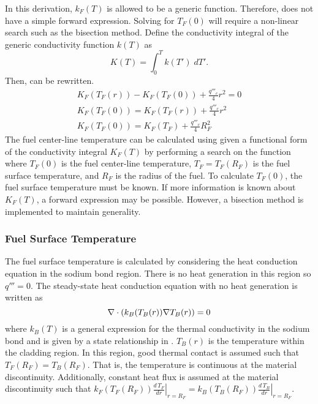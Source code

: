       In this derivation, $k_F(T)$ is allowed to be a generic function. 
      Therefore,  does not have a simple forward 
      expression. Solving for $T_F(0)$ will require a non-linear search such as
      the bisection method. Define the conductivity integral of the generic
      conductivity function $k(T)$ as
      \begin{equation}
        \label{eq:conductivity_integral}
        K(T) = \int_0^T k(T') \; dT'.
      \end{equation}
      Then,  can be rewritten.
      \begin{gather}
        K_F(T_F(r)) - K_F(T_F(0)) + \frac{q'''_c}{4} r^2 = 0 \\
        K_F(T_F(0)) = K_F(T_F(r)) + \frac{q'''_c}{4} r^2 \\
        \label{eq:tcl_conductivity_integral}
        K_F(T_F(0)) = K_F(T_F) + \frac{q'''_c}{4} R_F^2
      \end{gather}
      The fuel center-line temperature can be calculated using
       given a functional form of the
      conductivity integral $K_F(T)$ by performing a search on the function
      where $T_F(0)$ is the fuel center-line temperature, $T_F=T_F(R_F)$ is the
      fuel surface temperature, and $R_F$ is the radius of the fuel. To
      calculate $T_F(0)$, the fuel surface temperature must be known.
      If more information is known about $K_F(T)$, a forward expression
      may be possible. However, a bisection method is implemented to maintain
      generality.

    \subsubsection{Fuel Surface Temperature}
      The fuel surface temperature is calculated by considering the heat
      conduction equation in the sodium bond region. There is no heat generation
      in this region so $q'''=0$.
      The steady-state heat conduction equation with no heat generation is
      written as
      \begin{equation}
        \label{eq:tc_grad}
        \mathbf{\nabla} \cdot (k_B(T_B(r)) \mathbf{\nabla} T_B(r)) = 0
      \end{equation}
      where $k_B(T)$ is a general expression for the thermal conductivity in the
      sodium bond and is given by a state relationship in \cite{sodiumProp}.
      $T_B(r)$ is the temperature within the cladding region.
      In this region, good thermal contact is
      assumed such that $T_F(R_F)=T_B(R_F)$. That is, the temperature is 
      continuous at the material discontinuity. Additionally, constant heat flux
      is assumed at the material discontinuity such that $k_F(T_F(R_F))
      \left.\frac{d\,T_F}{dr}\right|_{r=R_F} = k_B(T_B(R_F))
      \left.\frac{d\,T_B}{dr}\right|_{r=R_F}$.

